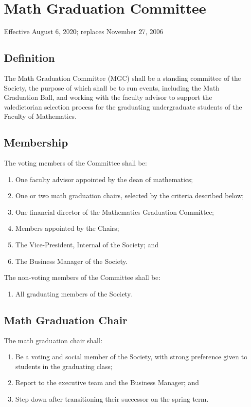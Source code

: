 \section{Math Graduation Committee}
Effective August 6, 2020; replaces November 27, 2006

\subsection{Definition}
The Math Graduation Committee (MGC) shall be a standing committee of the Society, the 
purpose of which shall be to run events, including the Math Graduation Ball, and
working with the faculty advisor to support the valedictorian selection process for
the graduating undergraduate students of the Faculty of Mathematics.

\subsection{Membership}
The voting members of the Committee shall be:
\begin{enumerate}
\item One faculty advisor appointed by the dean of mathematics;
\item One or two math graduation chairs, selected by the criteria described below;
\item One financial director of the Mathematics Graduation Committee;
\item Members appointed by the Chairs;
\item The Vice-President, Internal of the Society; and 
\item The Business Manager of the Society.
\end{enumerate}
The non-voting members of the Committee shall be:
\begin{enumerate}
\item All graduating members of the Society.
\end{enumerate}

\subsection{Math Graduation Chair}
The math graduation chair shall:
\begin{enumerate}
\item Be a voting and social member of the Society, with strong preference given to students in the graduating class;
\item Report to the executive team and the Business Manager; and 
\item Step down after transitioning their successor on the spring term.
\end{enumerate}

